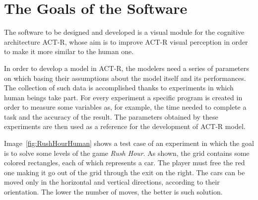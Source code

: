 	\section{The Goals of the Software}\label{TeamGoal}
	The software to be designed and developed is a visual module for the cognitive architecture ACT-R, whose aim is to improve ACT-R visual perception in order to make it more similar to the human one. 
	
	In order to develop a model in ACT-R, the modelers need a series of parameters on which basing their assumptions about the model itself and its performances.
	The collection of such data is accomplished thanks to experiments in which human beings take part. 
	For every experiment a specific program is created in order to measure some variables as, for example, the time needed to complete a task and the accuracy of the result.
	The parameters obtained by these experiments are then used as a reference for the development of ACT-R model.

 
	Image~\ref{fig:RushHourHuman} shows a test case of an experiment in which the goal is to solve some levels of the game \emph{Rush Hour}. As shown, the grid contains some colored rectangles, each of which represents a car. The player must free the red one making it go out of the grid through the exit on the right. The cars can be moved only in the horizontal and vertical directions, according to their orientation. %
	The lower the number of moves, the better is such solution.

